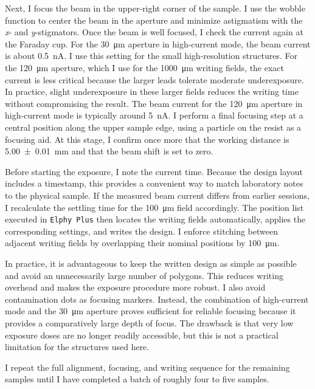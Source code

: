         Next, I focus the beam in the upper-right corner of the sample. I use the wobble function to center the beam in the aperture and minimize astigmatism with the \textit{x}- and \textit{y}-stigmators. Once the beam is well focused, I check the current again at the Faraday cup. For the \qty{30}{\micro\meter} aperture in high-current mode, the beam current is about \qty{0.5}{\nano\ampere}. I use this setting for the small high-resolution structures. For the \qty{120}{\micro\meter} aperture, which I use for the \qty{1000}{\micro\meter} writing fields, the exact current is less critical because the larger leads tolerate moderate underexposure. In practice, slight underexposure in these larger fields reduces the writing time without compromising the result. The beam current for the \qty{120}{\micro\meter} aperture in high-current mode is typically around \qty{5}{\nano\ampere}. I perform a final focusing step at a central position along the upper sample edge, using a particle on the resist as a focusing aid. At this stage, I confirm once more that the working distance is \qty{5.00(1)}{\milli\meter} and that the beam shift is set to zero.

        Before starting the exposure, I note the current time. Because the design layout includes a timestamp, this provides a convenient way to match laboratory notes to the physical sample. If the measured beam current differs from earlier sessions, I recalculate the settling time for the \qty{100}{\micro\meter} field accordingly. The position list executed in \texttt{Elphy Plus} then locates the writing fields automatically, applies the corresponding settings, and writes the design. I enforce stitching between adjacent writing fields by overlapping their nominal positions by \qty{100}{\micro\meter}.

        In practice, it is advantageous to keep the written design as simple as possible and avoid an unnecessarily large number of polygons. This reduces writing overhead and makes the exposure procedure more robust. I also avoid contamination dots as focusing markers. Instead, the combination of high-current mode and the \qty{30}{\micro\meter} aperture proves sufficient for reliable focusing because it provides a comparatively large depth of focus. The drawback is that very low exposure doses are no longer readily accessible, but this is not a practical limitation for the structures used here.
        
        I repeat the full alignment, focusing, and writing sequence for the remaining samples until I have completed a batch of roughly four to five samples.

